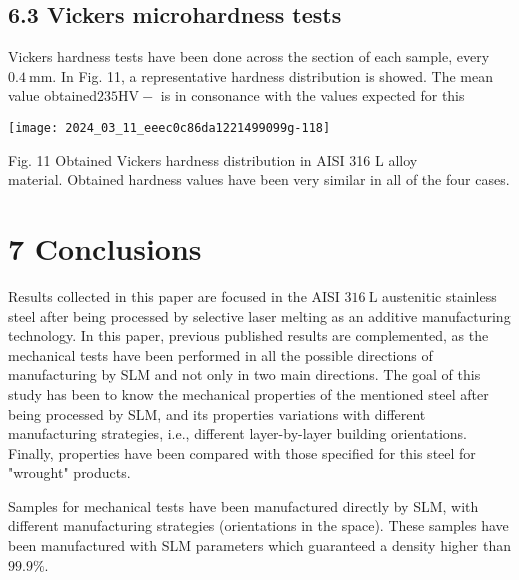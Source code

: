 \documentclass[10pt]{article}
\begin{document}
\subsection*{6.3 Vickers microhardness tests}
Vickers hardness tests have been done across the section of each sample, every $0.4 \mathrm{~mm}$. In Fig. 11, a representative hardness distribution is showed. The mean value obtained$235 \mathrm{HV}-$ is in consonance with the values expected for this

\begin{center}
\texttt{[image: 2024\_03\_11\_eeec0c86da1221499099g-118]}
\end{center}

Fig. 11 Obtained Vickers hardness distribution in AISI 316 L alloy\\
material. Obtained hardness values have been very similar in all of the four cases.

\section*{7 Conclusions}
Results collected in this paper are focused in the AISI $316 \mathrm{~L}$ austenitic stainless steel after being processed by selective laser melting as an additive manufacturing technology. In this paper, previous published results are complemented, as the mechanical tests have been performed in all the possible directions of manufacturing by SLM and not only in two main directions. The goal of this study has been to know the mechanical properties of the mentioned steel after being processed by SLM, and its properties variations with different manufacturing strategies, i.e., different layer-by-layer building orientations. Finally, properties have been compared with those specified for this steel for "wrought" products.

Samples for mechanical tests have been manufactured directly by SLM, with different manufacturing strategies (orientations in the space). These samples have been manufactured with SLM parameters which guaranteed a density higher than $99.9 \%$.
\end{document}
